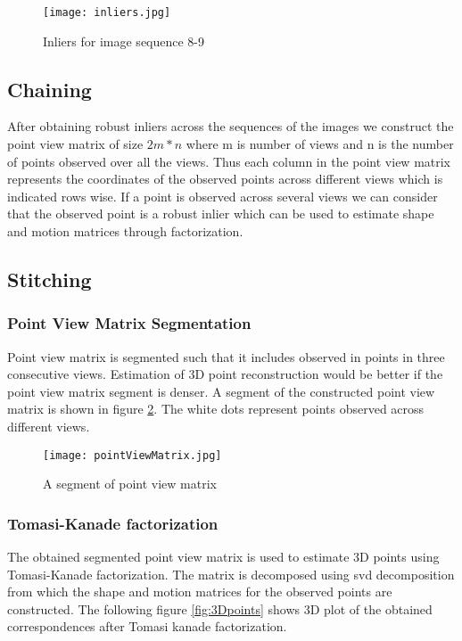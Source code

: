\documentclass[11pt,twocolumn,pdftex]{article}
\begin{document}
\begin{figure}[h]
	\centering 
    \texttt{[image: inliers.jpg]}
    \caption{Inliers for image sequence 8-9}
    \label{fig:inliers}
\end{figure}


\subsection{Chaining} \label{chaining}
After obtaining robust inliers across the sequences of the images we construct the point view matrix of size $2m * n$ where m is number of views and n is the number of points observed over all the views. Thus each column in the point view matrix represents the coordinates of the observed points across different views which is indicated rows wise. If a point is observed across several views we can consider that the observed point is a robust inlier which can be used to estimate shape and motion matrices through factorization. 


\subsection{Stitching} \label{stitching}


\subsubsection{Point View Matrix Segmentation} 
Point view matrix is segmented such that it includes observed in points in three consecutive views. Estimation of 3D point reconstruction would be better if the point view matrix segment
is denser. A segment of the constructed point view matrix is shown in figure \ref{fig:pointViewMatrix}. The white dots represent points observed across different views.


\begin{figure}[h]
	\centering 
    \texttt{[image: pointViewMatrix.jpg]}
    \caption{A segment of point view matrix}
    \label{fig:pointViewMatrix}
\end{figure}


\subsubsection{Tomasi-Kanade factorization}
The obtained segmented point view matrix is used to estimate 3D points using Tomasi-Kanade factorization. The matrix is decomposed using svd decomposition from which the shape and motion matrices for the observed points are constructed. The following figure \ref{fig:3Dpoints}  shows 3D plot of the obtained correspondences after Tomasi kanade factorization.
\end{document}
